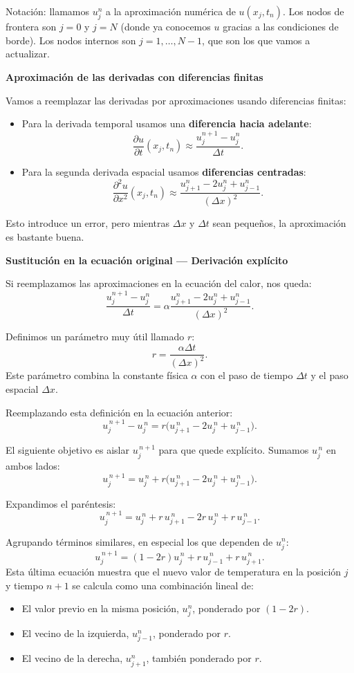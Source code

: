 \documentclass[12pt,a4paper]{article}
\begin{document}
Notación: llamamos $u_j^n$ a la aproximación numérica de $u(x_j,t_n)$.  
Los nodos de frontera son $j=0$ y $j=N$ (donde ya conocemos $u$ gracias a las condiciones de borde). Los nodos internos son $j=1,\dots,N-1$, que son los que vamos a actualizar.

\textbf{Aproximación de las derivadas con diferencias finitas}

Vamos a reemplazar las derivadas por aproximaciones usando diferencias finitas:
\begin{itemize}
    \item Para la derivada temporal usamos una \textbf{diferencia hacia adelante}:
    \[
    \frac{\partial u}{\partial t}(x_j,t_n) \approx \frac{u_j^{n+1}-u_j^n}{\Delta t}.
    \]
    \item Para la segunda derivada espacial usamos \textbf{diferencias centradas}:
    \[
    \frac{\partial^2 u}{\partial x^2}(x_j,t_n) \approx \frac{u_{j+1}^n - 2u_j^n + u_{j-1}^n}{(\Delta x)^2}.
    \]
\end{itemize}

Esto introduce un error, pero mientras $\Delta x$ y $\Delta t$ sean pequeños, la aproximación es bastante buena.

\textbf{Sustitución en la ecuación original --- Derivación explícito}

Si reemplazamos las aproximaciones en la ecuación del calor, nos queda:
\[
\frac{u_j^{n+1}-u_j^n}{\Delta t} = \alpha \frac{u_{j+1}^n - 2u_j^n + u_{j-1}^n}{(\Delta x)^2}.
\]

Definimos un parámetro muy útil llamado $r$:
\[
r = \frac{\alpha \Delta t}{(\Delta x)^2}.
\]
Este parámetro combina la constante física \(\alpha\) con el paso de tiempo \(\Delta t\) y el paso espacial \(\Delta x\). 

Reemplazando esta definición en la ecuación anterior:
\[
u_j^{\,n+1}-u_j^{\,n} = r\big(u_{j+1}^{\,n}-2u_j^{\,n}+u_{j-1}^{\,n}\big).
\]

El siguiente objetivo es aislar \(u_j^{\,n+1}\) para que quede explícito. Sumamos \(u_j^{\,n}\) en ambos lados:
\[
u_j^{\,n+1} = u_j^{\,n} + r\big(u_{j+1}^{\,n}-2u_j^{\,n}+u_{j-1}^{\,n}\big).
\]

Expandimos el paréntesis:
\[
u_j^{\,n+1} = u_j^{\,n} + r\,u_{j+1}^{\,n} - 2r\,u_j^{\,n} + r\,u_{j-1}^{\,n}.
\]

Agrupando términos similares, en especial los que dependen de \(u_j^n\):
\[
u_j^{\,n+1} = (1 - 2r)u_j^{\,n} + r\,u_{j-1}^{\,n} + r\,u_{j+1}^{\,n}.
\]
\newline
Esta última ecuación muestra que el nuevo valor de temperatura en la posición \(j\) y tiempo \(n+1\) se calcula como una combinación lineal de:
\begin{itemize}
    \item El valor previo en la misma posición, \(u_j^n\), ponderado por \((1-2r)\).
    \item El vecino de la izquierda, \(u_{j-1}^n\), ponderado por \(r\).
    \item El vecino de la derecha, \(u_{j+1}^n\), también ponderado por \(r\).
\end{itemize}
\end{document}
